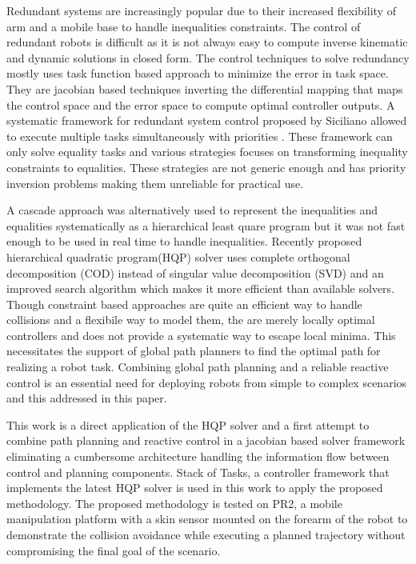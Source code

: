 Redundant systems are increasingly popular due to their increased flexibility of arm and a mobile base to handle inequalities constraints. The control of redundant robots is difficult as it is not always easy to compute inverse kinematic and dynamic solutions in closed form. The control techniques to solve redundancy mostly uses task function based approach to minimize the error in task space\cite{Samson1991}. They are jacobian based techniques inverting the differential mapping that maps the control space and the error space to compute optimal controller outputs. A systematic framework for redundant system control proposed by Siciliano allowed to execute multiple tasks simultaneously with priorities \cite{siciliano1991general}. These framework can only solve equality tasks and various strategies focuses on transforming inequality constraints to equalities\cite{Nelson95strategiesfor}\cite{chan1995weighted}\cite{mansard2009directional}\cite{raunhardt2007progressive}. These strategies are not generic enough and has priority inversion problems making them unreliable for practical use.

A cascade approach was alternatively used to represent the inequalities and equalities systematically as a hierarchical least quare program\cite{kanoun2011kinematic} but it was not fast enough to be used in real time to handle inequalities. Recently proposed hierarchical quadratic program(HQP) solver uses complete orthogonal decomposition (COD) instead of singular value decomposition (SVD) and an improved search algorithm which makes it more efficient than available solvers\cite{escande2014hierarchical}. Though constraint based approaches are quite an efficient way to handle collisions and a flexibile way to model them, the are merely locally optimal controllers and does not provide a systematic way to escape local minima. This necessitates the support of global path planners to find the optimal
path for realizing a robot task. Combining global path planning and a reliable reactive control is an essential need for deploying robots from simple to complex scenarios and this addressed in this paper. 

This work is a direct application of the HQP solver and a first attempt to combine path planning and reactive control in a jacobian based solver framework eliminating a cumbersome architecture handling the information flow between control and planning components. Stack of Tasks, a controller framework that implements the latest HQP solver is used in this work to apply the proposed methodology. The proposed methodology is tested on PR2, a mobile manipulation platform with a skin sensor mounted on the forearm of the robot to demonstrate the collision avoidance while executing a planned trajectory without compromising the final goal of the scenario. 


